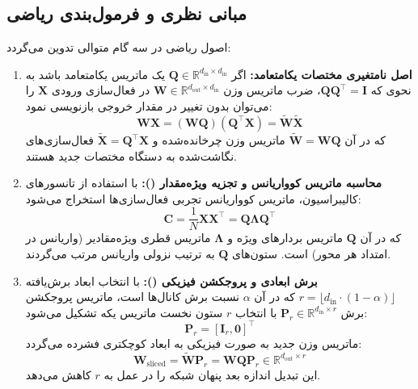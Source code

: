 \subsection{مبانی نظری و فرمول‌بندی ریاضی}
اصول ریاضی  در سه گام متوالی تدوین می‌گردد:

\begin{enumerate}
    \item \textbf{اصل نامتغیری مختصات یکامتعامد:}
    اگر $\mathbf{Q} \in \mathbb{R}^{d_{\text{in}} \times d_{\text{in}}}$ یک ماتریس یکامتعامد باشد به نحوی که $\mathbf{Q} \mathbf{Q}^\top = \mathbf{I}$، ضرب ماتریس وزن $\mathbf{W} \in \mathbb{R}^{d_{\text{out}} \times d_{\text{in}}}$ در فعال‌سازی ورودی $\mathbf{X}$ را می‌توان بدون تغییر در مقدار خروجی بازنویسی نمود:
    \begin{equation}
    \mathbf{W} \mathbf{X} = (\mathbf{W} \mathbf{Q}) (\mathbf{Q}^\top \mathbf{X}) = \tilde{\mathbf{W}} \tilde{\mathbf{X}}
    \end{equation}
    که در آن $\tilde{\mathbf{W}} = \mathbf{W} \mathbf{Q}$ ماتریس وزن چرخانده‌شده و $\tilde{\mathbf{X}} = \mathbf{Q}^\top \mathbf{X}$ فعال‌سازی‌های نگاشت‌شده به دستگاه مختصات جدید هستند.

    \item \textbf{محاسبه ماتریس کوواریانس و تجزیه ویژه‌مقدار ():}
    با استفاده از تانسورهای کالیبراسیون، ماتریس کوواریانس تجربی فعال‌سازی‌ها استخراج می‌شود:
    \begin{equation}
    \mathbf{C} = \frac{1}{N} \mathbf{X} \mathbf{X}^\top = \mathbf{Q} \mathbf{\Lambda} \mathbf{Q}^\top
    \end{equation}
    که در آن $\mathbf{Q}$ ماتریس بردارهای ویژه و $\mathbf{\Lambda}$ ماتریس قطری ویژه‌مقادیر (واریانس در امتداد هر محور) است. ستون‌های $\mathbf{Q}$ به ترتیب نزولی واریانس مرتب می‌گردند.

    \item \textbf{برش ابعادی و پروجکشن فیزیکی ():}
    با انتخاب ابعاد برش‌یافته $r = \lfloor d_{\text{in}} \cdot (1 - \alpha) \rfloor$ که در آن $\alpha$ نسبت برش کانال‌ها است، ماتریس پروجکشن برش $\mathbf{P}_r \in \mathbb{R}^{d_{\text{in}} \times r}$ با انتخاب $r$ ستون نخست ماتریس یکه تشکیل می‌شود:
    \begin{equation}
    \mathbf{P}_r = [\mathbf{I}_r, \mathbf{0}]^\top
    \end{equation}
    ماتریس وزن جدید به صورت فیزیکی به ابعاد کوچکتری فشرده می‌گردد:
    \begin{equation}
    \mathbf{W}_{\text{sliced}} = \tilde{\mathbf{W}} \mathbf{P}_r = \mathbf{W} \mathbf{Q} \mathbf{P}_r \in \mathbb{R}^{d_{\text{out}} \times r}
    \end{equation}
    این تبدیل اندازه بعد پنهان شبکه را در عمل به $r$ کاهش می‌دهد.
\end{enumerate}


